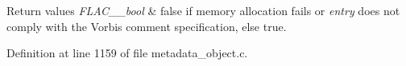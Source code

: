 \begin{DoxyRetVals}{Return values}
{\em F\+L\+A\+C\+\_\+\+\_\+bool} & {\ttfamily false} if memory allocation fails or {\itshape entry} does not comply with the Vorbis comment specification, else {\ttfamily true}. \\
\hline
\end{DoxyRetVals}


Definition at line 1159 of file metadata\+\_\+object.\+c.

